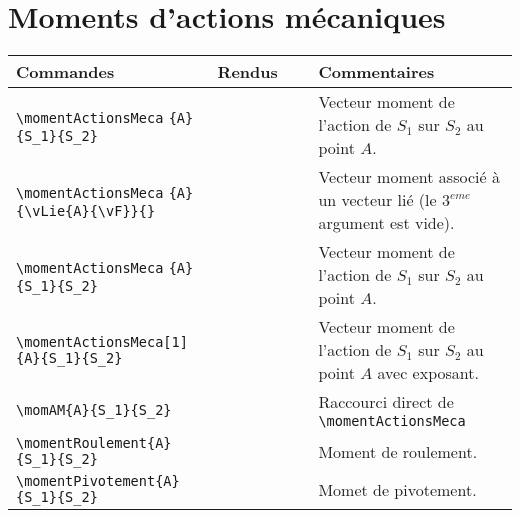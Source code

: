 \documentclass[a4paper,12pt]{article}
\begin{document}
	\section{Moments d'actions mécaniques}
		\noindent
		\begin{tabular}{|p{0.4\linewidth}|p{0.2\linewidth}|p{0.4\linewidth}|}
			\hline
				\textbf{Commandes}&\textbf{Rendus}&\textbf{Commentaires}
			\\\hline\hline
				\verb!\momentActionsMeca! \verb!{A}{S_1}{S_2}!		&	\momentActionsMeca{A}{S_1}{S_2}	&	Vecteur moment de l'action de $S_1$ sur $S_2$ au point $A$.
			\\\hline
				\verb!\momentActionsMeca! \verb!{A}{\vLie{A}{\vF}}{}!	&	\momentActionsMeca{A}{\vLie{A}{\vF}}{}	&	Vecteur moment associé à un vecteur lié (le $3^{eme}$ argument est vide).
			\\\hline
				\verb!\momentActionsMeca! \verb!{A}{S_1}{S_2}!		&	\momentActionsMeca{A}{S_1}{S_2}	&	Vecteur moment de l'action de $S_1$ sur $S_2$ au point $A$.
			\\\hline
				\verb!\momentActionsMeca[1]! \verb!{A}{S_1}{S_2}!	&	\momentActionsMeca[1]{A}{S_1}{S_2}	&	Vecteur moment de l'action de $S_1$ sur $S_2$ au point $A$ avec exposant.
			\\\hline
				\verb!\momAM{A}{S_1}{S_2}!				&	\momAM{A}{S_1}{S_2}		&	Raccourci direct de \verb!\momentActionsMeca!
			\\\hline
				\verb!\momentRoulement{A}! \verb!{S_1}{S_2}!		&	\momentRoulement{A}{S_1}{S_2}		&	Moment de roulement.
			\\\hline
				\verb!\momentPivotement{A}! \verb!{S_1}{S_2}!		&	\momentPivotement{A}{S_1}{S_2}		&	Momet de pivotement.
			\\\hline
		\end{tabular}
\end{document}

